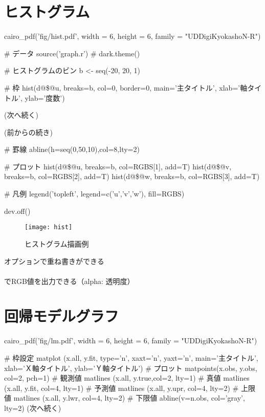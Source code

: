 \documentclass[../main]{subfiles}
\begin{document}
\section{ヒストグラム}

\begin{ConsoleR}
cairo_pdf('fig/hist.pdf', width = 6, height = 6, family = "UDDigiKyokashoN-R")

# データ
source('graph.r')
# dark.theme()

# ヒストグラムのビン
b <- seq(-20, 20, 1)

# 枠
hist(d@\$@u, breaks=b, col=0, border=0, main='主タイトル', xlab='軸タイトル', ylab='度数')

(次へ続く)
\end{ConsoleR}

\begin{ConsoleR}
(前からの続き)

# 罫線
abline(h=seq(0,50,10),col=8,lty=2)

# プロット
hist(d@\$@u, breaks=b, col=RGBS[1], add=T)
hist(d@\$@v, breaks=b, col=RGBS[2], add=T)
hist(d@\$@w, breaks=b, col=RGBS[3], add=T)

# 凡例
legend('topleft', legend=c('u','v','w'), fill=RGBS)

dev.off()
\end{ConsoleR}

\begin{figure}[H]
  \centering
  \texttt{[image: hist]}
  \caption{ヒストグラム描画例}
  \label{fig:hist}
\end{figure}

 オプションで重ね書きができる\\
\\
      \hfill でRGB値を出力できる（alpha: 透明度）

\section{回帰モデルグラフ}

\begin{ConsoleR}
cairo_pdf('fig/lm.pdf', width = 6, height = 6, family = "UDDigiKyokashoN-R")

# 枠設定
matplot (x.all, y.fit, type='n', xaxt='n', yaxt='n', main='主タイトル', xlab='Ｘ軸タイトル', ylab='Ｙ軸タイトル')
# プロット
matpoints(x.obs, y.obs, col=2, pch=1) # 観測値
matlines (x.all, y.true,col=2, lty=1) # 真値
matlines (x.all, y.fit, col=4, lty=1) # 予測値
matlines (x.all, y.upr, col=4, lty=2) # 上限値
matlines (x.all, y.lwr, col=4, lty=2) # 下限値
abline(v=n.obs, col='gray', lty=2)
(次へ続く)
\end{ConsoleR}
\end{document}
